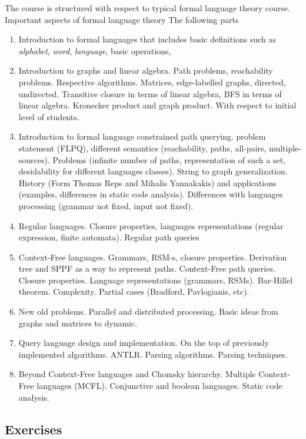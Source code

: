 \documentclass[sigconf]{acmart}
\begin{document}
The course is structured with respect to typical formal language theory course. 
Important aspects of formal language theory 
The following parts
\begin{enumerate}
  \item Introduction to formal languages that includes basic definitions such as \emph{alphabet}, \emph{word}, \emph{language}, basic operations, 
  \item Introduction to graphs and linear algebra.
  Path problems, reachability problems. Respective algorithms. 
  Matrices, edge-labelled graphs, directed, undirected. Transitive closure in terms of linear algebra, BFS in terms of linear algebra. Kronecker product and graph product.
  With respect to initial level of students.
  \item Introduction to formal language constrained path querying. problem statement (FLPQ), different semantics (reachability, paths, all-pairs, multiple-sources). 
  Problems (infinite number of paths, representation of such a set, desidability for different languages classes). 
  String to graph generalization. 
  History (Form Thomas Reps and Mihalis Yannakakis) and applications (examples, differences in static code analysis). 
  Differences with languages processing (grammar not fixed, input not fixed).
  \item Regular languages. Closure properties, languages representations (regular expression, finite automata). Regular path queries
  \item Context-Free languages. Grammars, RSM-s, closure properties. Derivation tree and SPPF as a way to represent paths. Context-Free path queries. 
  Closure properties. 
  Language representations (grammars, RSMs). 
  Bar-Hillel theorem. 
  Complexity. 
  Partial cases (Bradford, Pavlogianis, etc).
  \item New old problems. Parallel and distributed processing. Basic ideas from graphs and matrices to dynamic. 
  \item Query language design and implementation. On the top of previously implemented algorithms. ANTLR. Parsing algorithms. Parsing techniques.
  \item Beyond Context-Free languages and Chomsky hierarchy. Multiple Context-Free languages (MCFL). Conjunctive and boolean languages. Static code analysis.
\end{enumerate}

\subsection{Exercises}
\end{document}
